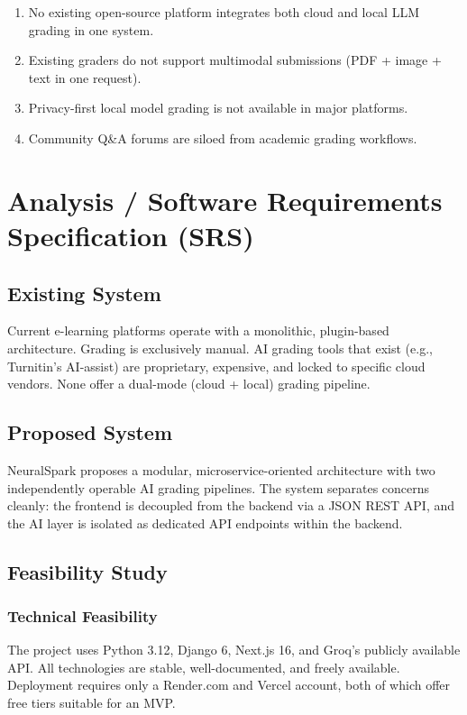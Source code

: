 \documentclass[12pt,a4paper]{report}
\begin{document}
\begin{enumerate}
    \item No existing open-source platform integrates both cloud and local LLM grading in one system.
    \item Existing graders do not support multimodal submissions (PDF + image + text in one request).
    \item Privacy-first local model grading is not available in major platforms.
    \item Community Q\&A forums are siloed from academic grading workflows.
\end{enumerate}

\chapter{Analysis / Software Requirements Specification (SRS)}

\section{Existing System}
Current e-learning platforms operate with a monolithic, plugin-based architecture. Grading
is exclusively manual. AI grading tools that exist (e.g., Turnitin's AI-assist) are
proprietary, expensive, and locked to specific cloud vendors. None offer a dual-mode
(cloud + local) grading pipeline.

\section{Proposed System}
NeuralSpark proposes a modular, microservice-oriented architecture with two independently
operable AI grading pipelines. The system separates concerns cleanly: the frontend is
decoupled from the backend via a JSON REST API, and the AI layer is isolated as dedicated
API endpoints within the backend.

\section{Feasibility Study}

\subsection{Technical Feasibility}
The project uses Python 3.12, Django 6, Next.js 16, and Groq's publicly available API.
All technologies are stable, well-documented, and freely available. Deployment requires
only a Render.com and Vercel account, both of which offer free tiers suitable for an MVP.
\end{document}
